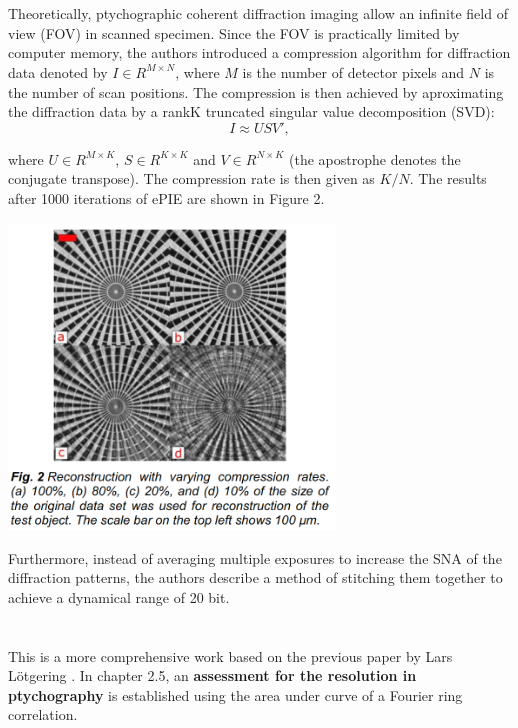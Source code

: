 \documentclass{article}
\begin{document}
\section{\cite{Loetgering_undated-wt} }

Theoretically, ptychographic coherent diffraction imaging allow an infinite field of view (FOV) in scanned specimen. Since the FOV is practically limited by computer memory, the authors introduced a compression algorithm for diffraction data denoted by $I \in R^{M\times N}$, where $M$ is the number of detector pixels and $N$ is the number of scan positions.
The compression is then achieved by aproximating the diffraction data by a rankK truncated singular value decomposition (SVD):
\begin{equation}
    I \approx USV',
\end{equation}

where $U \in R^{M \times K}$, $S \in R^{K \times K}$ and $V \in R^{N \times K}$ (the apostrophe denotes the conjugate transpose). The compression rate is then given as $K/ N$. The results after 1000 iterations of ePIE are shown in Figure 2.

\begin{center}
\includegraphics[width=0.65\textwidth]{figures/compression_ePIE.png}
\end{center}

Furthermore, instead of averaging multiple exposures to increase the SNA of the diffraction patterns, the authors describe a method of stitching them together to achieve a dynamical range of 20 bit.

\section{\cite{Loetgering2017-re} }

This is a more comprehensive work based on the previous paper by Lars Lötgering \cite{Loetgering_undated-wt}. In chapter 2.5, an \textbf{assessment for the resolution in ptychography} is established using the area under curve of a Fourier ring correlation.

\printbibliography
\end{document}
